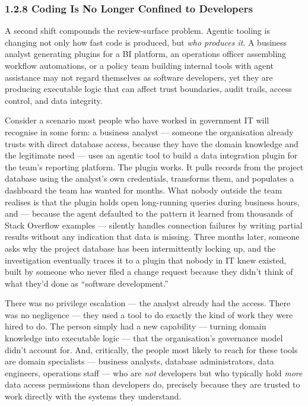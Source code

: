\documentclass[a4paper,11pt]{report}
\begin{document}
\hypertarget{coding-is-no-longer-confined-to-developers}{%
\subsubsection{1.2.8 Coding Is No Longer Confined to
Developers}\label{coding-is-no-longer-confined-to-developers}}

A second shift compounds the review-surface problem. Agentic tooling is
changing not only how fast code is produced, but \emph{who produces it}.
A business analyst generating plugins for a BI platform, an operations
officer assembling workflow automations, or a policy team building
internal tools with agent assistance may not regard themselves as
software developers, yet they are producing executable logic that can
affect trust boundaries, audit trails, access control, and data
integrity.

Consider a scenario most people who have worked in government IT will
recognise in some form: a business analyst --- someone the organisation
already trusts with direct database access, because they have the domain
knowledge and the legitimate need --- uses an agentic tool to build a
data integration plugin for the team's reporting platform. The plugin
works. It pulls records from the project database using the analyst's
own credentials, transforms them, and populates a dashboard the team has
wanted for months. What nobody outside the team realises is that the
plugin holds open long-running queries during business hours, and ---
because the agent defaulted to the pattern it learned from thousands of
Stack Overflow examples --- silently handles connection failures by
writing partial results without any indication that data is missing.
Three months later, someone asks why the project database has been
intermittently locking up, and the investigation eventually traces it to
a plugin that nobody in IT knew existed, built by someone who never
filed a change request because they didn't think of what they'd done as
``software development.''

There was no privilege escalation --- the analyst already had the
access. There was no negligence --- they used a tool to do exactly the
kind of work they were hired to do. The person simply had a new
capability --- turning domain knowledge into executable logic --- that
the organisation's governance model didn't account for. And, critically,
the people most likely to reach for these tools are domain specialists
--- business analysts, database administrators, data engineers,
operations staff --- who are \emph{not} developers but who typically
hold \emph{more} data access permissions than developers do, precisely
because they are trusted to work directly with the systems they
understand.
\end{document}
